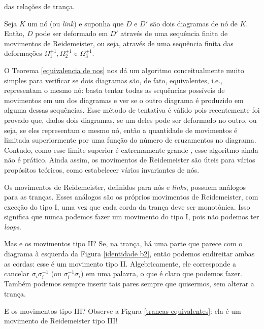 	das relações de trança.
	\begin{theorem}
	\label{equivalencia de nos}
		Seja $K$ um nó (ou \textit{link}) e suponha que $D$ e $D'$ são dois diagramas de nó de $K$. 
		Então, $D$ pode ser deformado em $D'$ através de uma sequência finita de movimentos de 
		Reidemeister, ou seja, através de uma sequência finita das deformações 
		$\Omega_1^{\pm1}, \Omega_2^{\pm1}$ e $\Omega_3^{\pm1}$. 
	\end{theorem}  
	O Teorema \ref{equivalencia de nos} nos dá um algoritmo conceitualmente muito simples 
	para verificar se dois diagramas são, de fato, equivalentes, i.e., representam o mesmo nó: 
	basta tentar todas as sequências possíveis de movimentos em um dos diagramas e ver se o outro 
	diagrama é produzido em alguma dessas sequências. Esse método de tentativa é válido pois 
	recentemente foi provado que, dados dois diagramas, se um deles pode ser deformado no outro, 
	ou seja, se eles representam o mesmo nó, então a quantidade de movimentos é limitada superiormente 
	por uma função do número de cruzamentos no diagrama. Contudo, como esse limite superior é extremamente
	grande \cite{limite-superior-1, limite-superior-2, limite-superior-3}, esse algoritmo ainda não é prático.
	Ainda assim, os movimentos de Reidemeister são úteis para vários propósitos teóricos, como estabelecer 
	vários invariantes de nós.
	
	\par\vspace{0.3cm} Os movimentos de Reidemeister, definidos para nós e \textit{links}, possuem 
	análogos para as tranças. Esses análogos são os próprios movimentos de Reidemeister, com exceção 
	do tipo I, uma vez que cada corda da trança deve ser monotônica. Isso significa que nunca podemos 
	fazer um movimento do tipo I, pois não podemos ter \textit{loops}.
	
	\par\vspace{0.3cm} Mas e os movimentos tipo II? Se, na trança, há uma parte que parece com o diagrama à
	esquerda da Figura \ref{identidade b2}, então podemos endireitar ambas as cordas: esse é um movimento 
	tipo II. Algebricamente, ele corresponde a cancelar $\sigma_i\sigma_i^{-1}$ (ou $\sigma_i^{-1}\sigma_i$) 
	em uma palavra, o que é claro que podemos fazer. Também podemos sempre inserir tais pares sempre que
	quisermos, sem alterar a trança.
	
	\par\vspace{0.3cm} E os movimentos tipo III? Observe a Figura \ref{trancas equivalentes}: 
	ela é um movimento de Reidemeister tipo III!
	
